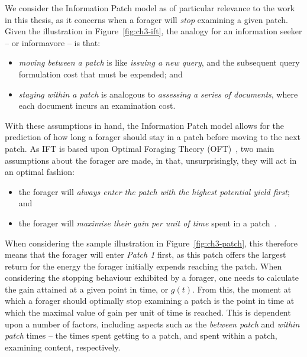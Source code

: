 We consider the Information Patch model as of particular relevance to the work in this thesis, as it concerns when a forager will \emph{stop} examining a given patch. Given the illustration in Figure~\ref{fig:ch3-ift}, the analogy for an information seeker -- or informavore -- is that:

\begin{itemize}
    \item{\emph{moving between a patch} is like \emph{issuing a new query}, and the subsequent query formulation cost that must be expended; and}
    \item{\emph{staying within a patch} is analogous to \emph{assessing a series of documents}, where each document incurs an examination cost.}
\end{itemize}

With these assumptions in hand, the Information Patch model allows for the prediction of how long a forager should stay in a patch before moving to the next patch. As IFT is based upon Optimal Foraging Theory (OFT)~\citep{stephens1986foraging_theory}, two main assumptions about the forager are made, in that, unsurprisingly, they will act in an optimal fashion:

\begin{itemize}
    \item{the forager will \emph{always enter the patch with the highest potential yield first}; and}
    \item{the forager will \emph{maximise their gain per unit of time} spent in a patch~\citep{pirolli1999ift, stephens1986foraging_theory}.}
\end{itemize}

When considering the sample illustration in Figure~\ref{fig:ch3-patch}, this therefore means that the forager will enter \emph{Patch 1} first, as this patch offers the largest return for the energy the forager initially expends reaching the patch. When considering the stopping behaviour exhibited by a forager, one needs to calculate the gain attained at a given point in time, or $g(t)$. From this, the moment at which a forager should optimally stop examining a patch is the point in time at which the maximal value of gain per unit of time is reached. This is dependent upon a number of factors, including aspects such as the \emph{between patch} and \emph{within patch} times -- the times spent getting to a patch, and spent within a patch, examining content, respectively. 

